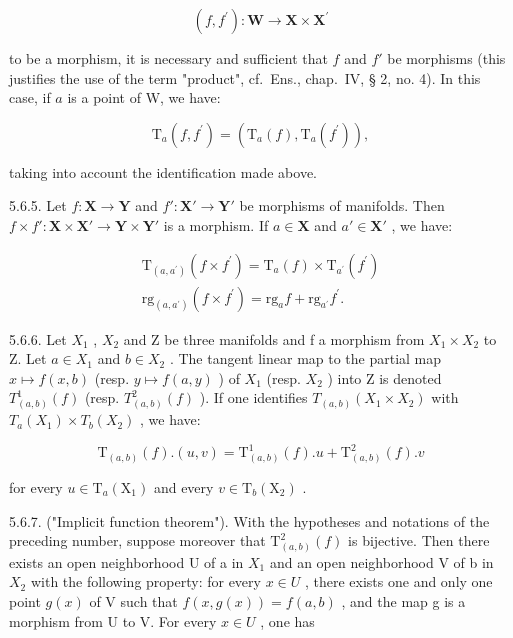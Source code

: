 \[
(f, f ^ {\prime}): \mathbf {W} \rightarrow \mathbf {X} \times \mathbf {X} ^ {\prime}
\]

to be a morphism, it is necessary and sufficient that \(f\) and \(f'\) be morphisms (this justifies the use of the term "product", cf.~Ens., chap.~IV, § 2, no. 4). In this case, if \(a\) is a point of W, we have:

\[
\mathrm{T} _ {a} (f, f ^ {\prime}) = (\mathrm{T} _ {a} (f), \mathrm{T} _ {a} (f ^ {\prime})),
\]

taking into account the identification made above.

5.6.5. Let \(f: \mathbf{X} \to \mathbf{Y}\) and \(f': \mathbf{X}' \to \mathbf{Y}'\) be morphisms of manifolds. Then \(f \times f': \mathbf{X} \times \mathbf{X}' \to \mathbf{Y} \times \mathbf{Y}'\) is a morphism. If \(a \in \mathbf{X}\) and \(a' \in \mathbf{X}'\) , we have:

\[
\begin{array}{l} \mathrm{T} _ {(a, a ^ {\prime})} (f \times f ^ {\prime}) = \mathrm{T} _ {a} (f) \times \mathrm{T} _ {a ^ {\prime}} (f ^ {\prime}) \\ \mathrm{rg} _ {(a, a ^ {\prime})} (f \times f ^ {\prime}) = \mathrm{rg} _ {a} f + \mathrm{rg} _ {a ^ {\prime}} f ^ {\prime}. \end{array}
\]

5.6.6. Let \(X_{1}\) , \(X_{2}\) and Z be three manifolds and f a morphism from \(X_{1} \times X_{2}\) to Z. Let \(a \in X_{1}\) and \(b \in X_{2}\) . The tangent linear map to the partial map \(x \mapsto f(x, b)\) (resp. \(y \mapsto f(a, y)\) ) of \(X_{1}\) (resp. \(X_{2}\) ) into Z is denoted \(T_{(a,b)}^{1}(f)\) (resp. \(T_{(a,b)}^{2}(f)\) ). If one identifies \(T_{(a,b)}(X_{1} \times X_{2})\) with \(T_{a}(X_{1}) \times T_{b}(X_{2})\) , we have:

\[
\mathrm{T} _ {(a, b)} (f). (u, v) = \mathrm{T} _ {(a, b)} ^ {1} (f). u + \mathrm{T} _ {(a, b)} ^ {2} (f). v
\]

for every \(u \in \mathrm{T}_a(\mathrm{X}_1)\) and every \(v \in \mathrm{T}_b(\mathrm{X}_2)\) .

5.6.7. ("Implicit function theorem"). With the hypotheses and notations of the preceding number, suppose moreover that \(\mathrm{T}_{(a,b)}^{2}(f)\) is bijective. Then there exists an open neighborhood U of a in \(X_{1}\) and an open neighborhood V of b in \(X_{2}\) with the following property: for every \(x \in U\) , there exists one and only one point \(g(x)\) of V such that \(f(x, g(x)) = f(a, b)\) , and the map g is a morphism from U to V. For every \(x \in U\) , one has

